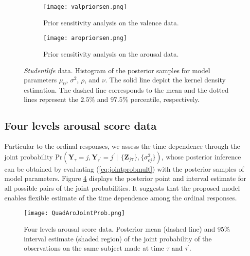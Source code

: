 \begin{figure}[t!]
\centering
\begin{subfigure}{\textwidth}
  \centering 
  \texttt{[image: valpriorsen.png]}  
  \caption{Prior sensitivity analysis on the valence data.}
  \label{subfig:valpriorsen}
\end{subfigure}
\begin{subfigure}{\textwidth}
  \centering 
  \texttt{[image: aropriorsen.png]}  
  \caption{Prior sensitivity analysis on the arousal data.}
  \label{subfig:aropriorsen}
\end{subfigure}
\caption{\textit{Studentlife} data. Histogram of the posterior samples for model parameters $\mu_0$, $\sigma^2$, $\rho$, and $\nu$. The solid line depict the kernel density estimation. The dashed line corresponds to the mean and the dotted lines represent the $2.5\%$ and $97.5\%$ percentile, respectively.}
\label{fig:priorsen}
\end{figure}



\subsection{Four levels arousal score data}

Particular to the ordinal responses, we assess the time dependence through the joint probability $\text{Pr}(\mathbf{Y}_{\tau}=j,\mathbf{Y}_{\tau^{\prime}}=j^{\prime}\mid\{\mathbf{Z}_{j\boldsymbol{\tau}}\},\{\sigma^2_{\epsilon j}\})$, whose posterior inference can be obtained by evaluating (\ref{eq:jointprobmult}) with the posterior samples of model parameters. Figure \ref{fig:quadarojointprob} displays the posterior point and interval estimate for all possible pairs of the joint probabilities. It suggests that the proposed model enables flexible estimate of the time dependence among the ordinal responses. 

\begin{figure}[t!]
\centering
\texttt{[image: QuadAroJointProb.png]}
\caption{Four levels arousal score data. Posterior mean (dashed line) and 95\% interval estimate (shaded region) of the joint probability of the observations on the same subject made at time $\tau$ and $\tau^{\prime}$.}
\label{fig:quadarojointprob}
\end{figure}

 
